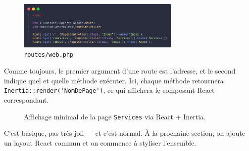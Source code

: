 \begin{figure}[H]
    \centering
    \includegraphics[width=0.7\textwidth]{figures-C1/routes_ini.png}
    \caption{\texttt{routes/web.php}}
\end{figure}

Comme toujours, le premier argument d’une route est l’adresse, et le second indique quel \controller{} et quelle méthode exécuter.  
Ici, chaque méthode retournera \verb|Inertia::render('NomDePage')|, ce qui affichera le composant React correspondant.

\begin{figure}[H]
    \centering
    \caption{Affichage minimal de la page \texttt{Services} via React + Inertia.}
\end{figure}

C’est basique, pas très joli — et c’est normal. À la prochaine section, on ajoute un layout React commun et on commence à styliser l’ensemble.
